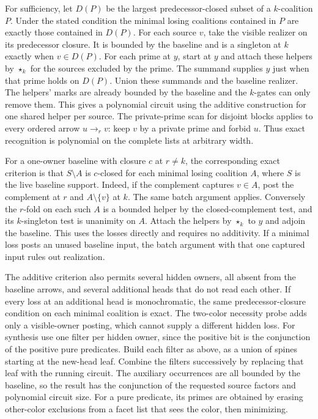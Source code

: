 For sufficiency, let $D(P)$ be the largest
predecessor-closed subset of a $k$-coalition $P$.
Under the stated condition the minimal losing
coalitions contained in $P$ are exactly those
contained in $D(P)$. For each source $v$, take the
visible realizer on its predecessor closure.
It is bounded by the baseline and is a singleton
at $k$ exactly when $v\in D(P)$. For each prime
at $y$, start at $y$ and attach these helpers by
$\star_k$ for the sources excluded by the prime.
The summand supplies $y$ just when that prime holds
on $D(P)$. Union these summands and the baseline
realizer. The helpers' marks are already bounded
by the baseline and the $k$-gates can only remove
them. This gives a polynomial circuit using the
additive construction for one shared helper per
source. The private-prime scan for disjoint
blocks applies to every ordered arrow $u\to_r v$:
keep $v$ by a private prime and forbid $u$.
Thus exact recognition is polynomial on the
complete lists at arbitrary width.

For a one-owner baseline with closure $c$
at $r\ne k$, the corresponding exact criterion
is that $S\setminus A$ is $c$-closed for each
minimal losing coalition $A$, where $S$ is the
live baseline support. Indeed, if the complement
captures $v\in A$, post the complement at $r$
and $A\setminus\{v\}$ at $k$. The same batch
argument applies. Conversely the $r$-fold on
each such $A$ is a bounded helper by the
closed-complement test, and its $k$-singleton
test is unanimity on $A$. Attach the helpers by
$\star_k$ to $y$ and adjoin the baseline. This
uses the losses directly and requires no
additivity. If a minimal loss posts an unused
baseline input, the batch argument with that
one captured input rules out realization.

The additive criterion also permits several hidden
owners, all absent from the baseline arrows, and
several additional heads that do not read each
other. If every loss at an additional head is
monochromatic, the same predecessor-closure
condition on each minimal coalition is exact.
The two-color necessity probe adds only a
visible-owner posting, which cannot supply a
different hidden loss. For synthesis use one
filter per hidden owner, since the positive bit
is the conjunction of the positive pure
predicates. Build each filter as above, as a
union of spines starting at the new-head leaf.
Combine the filters successively by replacing
that leaf with the running circuit.
The auxiliary occurrences are all bounded by
the baseline, so the result has the conjunction
of the requested source factors and polynomial
circuit size. For a pure predicate, its primes
are obtained by erasing other-color exclusions
from a facet list that sees the color, then
minimizing.

